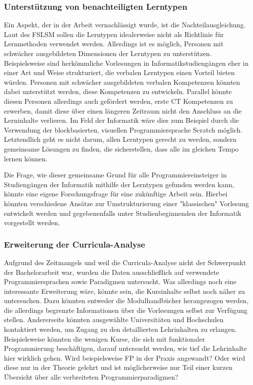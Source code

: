 \subsubsection{Unterstützung von benachteiligten Lerntypen}
Ein Aspekt, der in der Arbeit vernachlässigt wurde, ist die Nachteilausgleichung. Laut des FSLSM sollen die Lerntypen idealerweise nicht als Richtlinie für Lernmethoden verwendet werden. Allerdings ist es möglich, Personen mit schwächer ausgebildeten Dimensionen der Lerntypen zu unterstützen.
Beispielsweise sind herkömmliche Vorlesungen in Informatikstudiengängen eher in einer Art und Weise strukturiert, die verbalen Lerntypen einen Vorteil bieten würden. Personen mit schwächer ausgebildeten verbalen Kompetenzen könnten dabei unterstützt werden, diese Kompetenzen zu entwickeln. Parallel könnte diesen Personen allerdings auch gefördert werden, erste CT Kompetenzen zu erwerben, damit diese über einen längeren Zeitraum nicht den Anschluss an die Lerninhalte verlieren. Im Feld der Informatik wäre dies zum Beispiel durch die Verwendung der blockbasierten, visuellen Programmiersprache Scratch möglich.
Letztendlich geht es nicht darum, allen Lerntypen gerecht zu werden, sondern gemeinsame Lösungen zu finden, die sicherstellen, dass alle im gleichen Tempo lernen können.

Die Frage, wie dieser gemeinsame Grund für alle Programmiereinsteiger in Studiengängen der Informatik mithilfe der Lerntypen gefunden werden kann, könnte eine eigene Forschungsfrage für eine zukünftige Arbeit sein. Hierbei könnten verschiedene Ansätze zur Umstrukturierung einer "klassischen" Vorlesung entwickelt werden und gegebenenfalls unter Studienbeginnenden der Informatik vorgestellt werden.

\subsubsection{Erweiterung der Curricula-Analyse}
Aufgrund des Zeitmangels und weil die Curricula-Analyse nicht der Schwerpunkt der Bachelorarbeit war, wurden die Daten ausschließlich auf verwendete Programmiersprachen sowie Paradigmen untersucht. Was allerdings noch eine interessante Erweiterung wäre, könnte sein, die Kursinhalte selbst noch näher zu untersuchen. Dazu könnten entweder die Modulhandbücher herangezogen werden, die allerdings begrenzte Informationen über die Vorlesungen selbst zur Verfügung stellen. Andererseits könnten ausgewählte Universitäten und Hochschulen kontaktiert werden, um Zugang zu den detaillierten Lehrinhalten zu erlangen.
Beispielsweise könnten die wenigen Kurse, die sich mit funktionaler Programmierung beschäftigen, darauf untersucht werden, wie tief die Lehrinhalte hier wirklich gehen. Wird beispielsweise FP in der Praxis angewandt? Oder wird diese nur in der Theorie gelehrt und ist möglicherweise nur Teil einer kurzen Übersicht über alle verbreiteten Programmierparadigmen?

